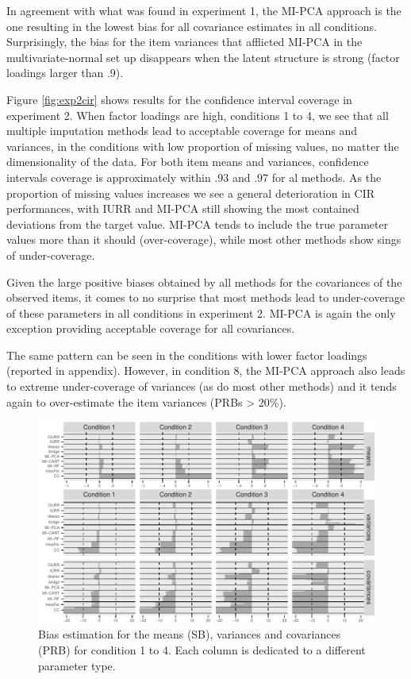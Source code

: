 	In agreement with what was found in experiment 1, the MI-PCA approach is the one resulting in the lowest
	bias for all covariance estimates in all conditions.
	Surprisingly, the bias for the item variances that afflicted MI-PCA in the multivariate-normal
	set up disappears when the latent structure is strong (factor loadings larger than .9).

	Figure \ref{fig:exp2cir} shows results for the confidence interval coverage in experiment 2.
	When factor loadings are high, conditions 1 to 4, we see that all multiple imputation
	methods lead to acceptable coverage for means and variances, in the conditions with low proportion 
	of missing values, no matter the dimensionality of the data.
	For both item means and variances, confidence intervals coverage is approximately within .93 and .97 
	for al methods. 
	As the proportion of missing values increases we see a general deterioration in CIR performances, with IURR
	and MI-PCA still showing the most contained deviations from the target value.
	MI-PCA tends to include the true parameter values more than it should (over-coverage), 
	while most other methods show sings of under-coverage.

	Given the large positive biases obtained by all methods for the covariances of the observed items,
	it comes to no surprise that most methods lead to under-coverage of these parameters in all
	conditions in experiment 2. 
	MI-PCA is again the only exception providing acceptable coverage for all covariances.

	The same pattern can be seen in the conditions with lower factor loadings (reported in appendix). 
	However, in condition 8, the MI-PCA approach also leads to extreme under-coverage of variances 
	(as do most other methods) and it tends again to over-estimate the item variances (PRBs > 20\%).

\begin{figure}
	\includegraphics{../../output/graphs/exp2_semR_bias_sd_14.pdf}
\caption{Bias estimation for the means (SB), variances and covariances (PRB) for condition 1 to 4.
	Each column is dedicated to a different parameter type.}
\label{fig:exp2bias}
\end{figure}

